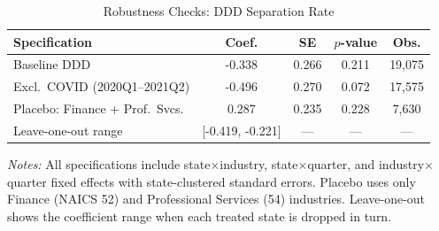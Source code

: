 \begin{table}[htbp]
\centering
\caption{Robustness Checks: DDD Separation Rate}
\label{tab:robustness}
\begin{tabular}{lcccc}
\hline\hline
Specification & Coef. & SE & $p$-value & Obs. \\
\hline
Baseline DDD & -0.338 & 0.266 & 0.211 & 19,075 \\
Excl.\ COVID (2020Q1--2021Q2) & -0.496 & 0.270 & 0.072 & 17,575 \\
Placebo: Finance + Prof.\ Svcs. & 0.287 & 0.235 & 0.228 & 7,630 \\
Leave-one-out range & [-0.419, -0.221] & --- & --- & --- \\
\hline\hline
\end{tabular}
\begin{tablenotes}[flushleft]
\small
\item \textit{Notes:} All specifications include state$\times$industry, state$\times$quarter, and industry$\times$quarter fixed effects with state-clustered standard errors. Placebo uses only Finance (NAICS 52) and Professional Services (54) industries. Leave-one-out shows the coefficient range when each treated state is dropped in turn.
\end{tablenotes}
\end{table}
